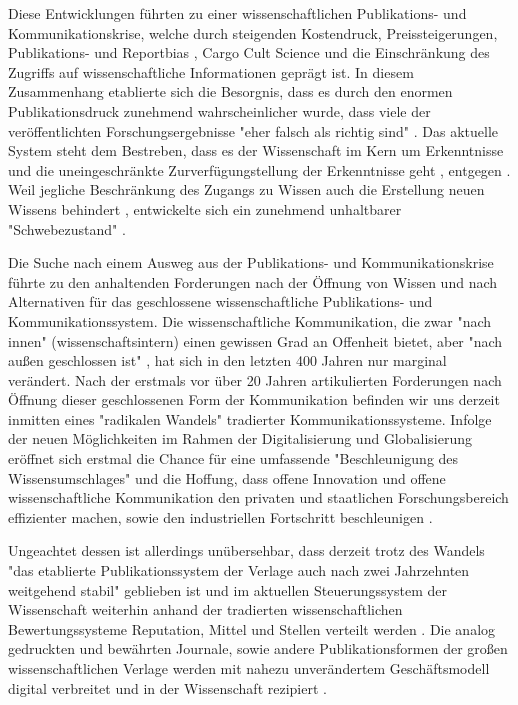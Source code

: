 Diese Entwicklungen führten zu einer wissenschaftlichen Publikations- und Kommunikationskrise, welche durch steigenden Kostendruck, Preissteigerungen, Publikations- \cite{Egger_1997} \cite{Fanelli_2012} und Reportbias \cite{Chan_2008} \cite{Dickersin_2011}, Cargo Cult Science \cite{Feynman_1974} und die Einschränkung des Zugriffs auf wissenschaftliche Informationen \cite{Hess_2006} geprägt ist. In diesem Zusammenhang etablierte sich die Besorgnis, dass es durch den enormen Publikationsdruck zunehmend wahrscheinlicher wurde, dass viele der veröffentlichten Forschungsergebnisse "eher falsch als richtig sind" \cite{Ioannidis_2005}. Das aktuelle System steht dem Bestreben, dass es der Wissenschaft im Kern um Erkenntnisse und die uneingeschränkte Zurverfügungstellung der Erkenntnisse geht \cite{hanekop_2006}, entgegen \cite{offhaus_2012_institutionelle_repos}. Weil jegliche Beschränkung des Zugangs zu Wissen auch die Erstellung neuen Wissens behindert \cite{cite:5} \cite{cite:8} \cite{Luhmann1998}, entwickelte sich ein zunehmend unhaltbarer "Schwebezustand" \cite{suchen}.

Die Suche nach einem Ausweg aus der Publikations- und Kommunikationskrise führte zu den anhaltenden Forderungen nach der Öffnung von Wissen und nach Alternativen für das geschlossene wissenschaftliche Publikations- und Kommunikationssystem. Die wissenschaftliche Kommunikation, die zwar "nach innen" (wissenschaftsintern) einen gewissen Grad an Offenheit bietet, aber "nach außen geschlossen ist" \cite{kelty_2004}, hat sich in den letzten 400 Jahren nur marginal verändert. Nach der erstmals vor über 20 Jahren artikulierten Forderungen nach Öffnung dieser geschlossenen Form der Kommunikation befinden wir uns derzeit inmitten eines "radikalen Wandels" \cite{poynder_2011_suber} tradierter Kommunikationssysteme. Infolge der neuen Möglichkeiten im Rahmen der Digitalisierung und Globalisierung \cite{mcluhan_1963_gutenberg} eröffnet sich erstmal die Chance für eine umfassende "Beschleunigung des Wissensumschlages" \cite{Wenzel_2003} und die Hoffung, dass offene Innovation und offene wissenschaftliche Kommunikation den privaten und staatlichen Forschungsbereich effizienter machen, sowie den industriellen Fortschritt beschleunigen \cite{cite:7}.

Ungeachtet dessen ist allerdings unübersehbar, dass derzeit trotz des Wandels "das etablierte Publikationssystem der Verlage auch nach zwei Jahrzehnten weitgehend stabil" \cite{Hanekop_2014} geblieben ist und im aktuellen Steuerungssystem der Wissenschaft weiterhin anhand der tradierten wissenschaftlichen Bewertungssysteme Reputation, Mittel und Stellen verteilt werden \cite{cite:4}. Die analog gedruckten und bewährten Journale, sowie andere Publikationsformen der großen wissenschaftlichen Verlage werden mit nahezu unverändertem Geschäftsmodell digital verbreitet \cite{Hanekop_2014} \cite{boai_2012} und in der Wissenschaft rezipiert \cite{suchen}.

